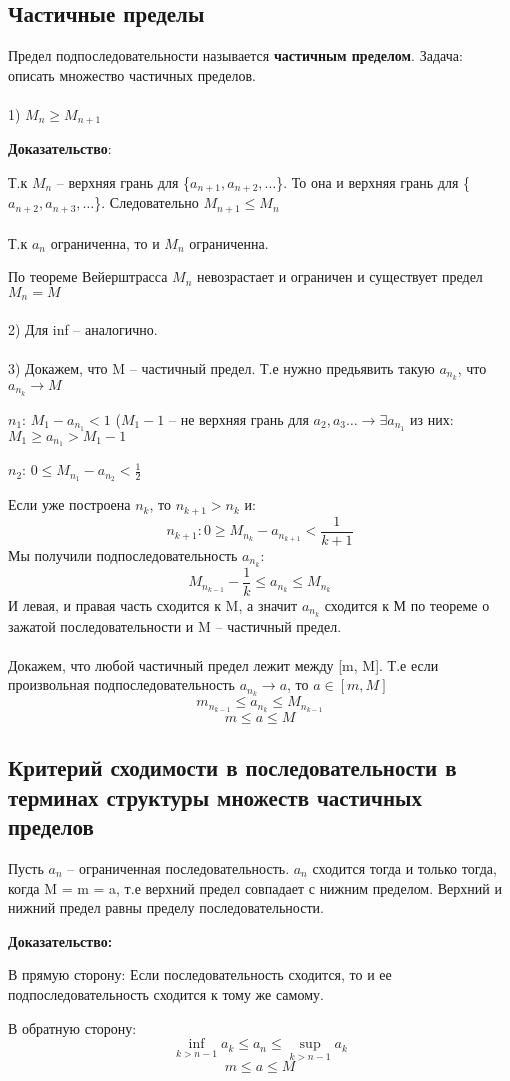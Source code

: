 \documentclass[a4paper,12pt]{article}
\begin{document}
\subsection*{Частичные пределы}
Предел подпоследовательности называется \textbf{частичным пределом}. Задача: описать множество частичных пределов.
\\\\
1) $M_n \geq M_{n+1}$

\textbf{Доказательство}:

Т.к  $M_n$ -- верхняя грань для \{$a_{n+1}, a_{n+2}, \ldots$\}. То она и верхняя грань для \{$a_{n+2}, a_{n+3}, \ldots$\}. Следовательно $M_{n+1} \leq M_n$
\\\\
Т.к $a_n$ ограниченна, то и $M_n$ ограниченна.

По теореме Вейерштрасса $M_n$ невозрастает и ограничен и существует предел $M_n = M$
\\\\
2)
Для inf -- аналогично.
\\\\
3) Докажем, что M -- частичный предел. Т.е нужно предьявить такую $a_{n_k}$,  что $a_{n_k} \rightarrow M$

$n_1$: $M_1 - a_{n_1} < 1$
($M_1 - 1$ -- не верхняя грань для $a_2, a_3\ldots \rightarrow \exists a_{n_1}$ из них: $M_1 \geq a_{n_1} > M_1 - 1$

$n_2$: $0 \leq M_{n_1} - a_{n_2} < \frac{1}{2}$

Если уже построена $n_k$, то $n_{k+1} > n_k$ и:
\[
n_{k+1} : 0 \geq M_{n_k} - a_{n_{k+1}} < \frac{1}{k+1}
\] 
Мы получили подпоследовательность $a_{n_k}$:
\[
M_{n_{k-1}} - \frac{1}{k} \leq a_{n_{k}} \leq M_{n_k}
\]
И левая, и правая часть сходится к M, а значит $a_{n_k}$ сходится к М по теореме о зажатой последовательности и M -- частичный предел.
\\\\
Докажем, что любой частичный предел лежит между [m, M]. Т.е если произвольная подпоследовательность $a_{n_k} \rightarrow a$, то $a \in [m,M]$
\[
m_{n_{k-1}} \leq a_{n_k} \leq M_{n_{k-1}}
\]
\[
m \leq a \leq M
\]
\subsection*{Критерий сходимости в последовательности в терминах структуры множеств частичных пределов}
Пусть $a_n$ -- ограниченная последовательность. $a_n$ сходится тогда и только тогда, когда M = m = a, т.е верхний предел совпадает с нижним пределом. Верхний и нижний предел равны пределу последовательности.

\textbf{Доказательство:}

В прямую сторону:
Если последовательность сходится, то и ее подпоследовательность сходится к тому же самому.

В обратную сторону:
\[
\inf_{k>n-1} a_k\leq a_n \leq \sup_{k>n-1} a_k
\]
\[
m \leq a \leq M
\]
\end{document}
